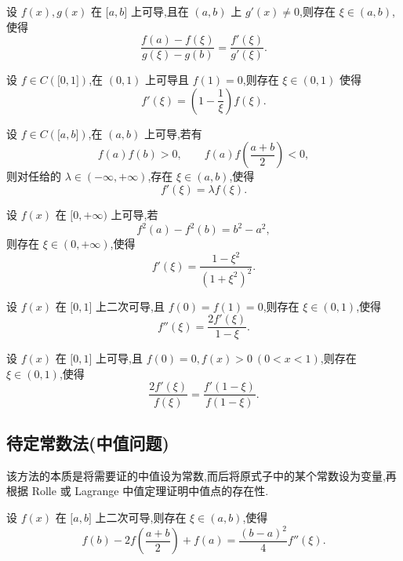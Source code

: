 \documentclass[../../数学分析培优讲义.tex]{subfiles}
\begin{document}
\begin{example}
设 $f(x),g(x)$ 在 $\lbrack a,b\rbrack$ 上可导,且在 $(a,b)$ 上 $g'(x)\neq0$,则存在 $\xi\in(a,b)$,使得
\[
    \dfrac{f(a)-f(\xi)}{g(\xi)-g(b)}=\dfrac{f'(\xi)}{g'(\xi)}.
\]
\end{example}
\exampleblank

\begin{example}
设 $f\in C(\lbrack 0,1\rbrack)$,在 $(0,1)$ 上可导且 $f(1)=0$,则存在 $\xi\in(0,1)$ 使得
\[
    f'(\xi)=\left(1-\dfrac{1}{\xi}\right)f(\xi).
\]
\end{example}
\exampleblank

\begin{example}
设 $f\in C(\lbrack a,b\rbrack)$,在 $(a,b)$ 上可导,若有
\[
    f(a)f(b)>0,
    \qquad
    f(a)f\left(\dfrac{a+b}{2}\right)<0,
\]
则对任给的 $\lambda\in(-\infty,+\infty)$,存在 $\xi\in(a,b)$,使得
\[
    f'(\xi)=\lambda f(\xi).
\]
\end{example}
\exampleblank

\begin{example}
设 $f(x)$ 在 $\lbrack 0,+\infty)$ 上可导,若
\[
    f^2(a)-f^2(b)=b^2-a^2,
\]
则存在 $\xi\in(0,+\infty)$,使得
\[
    f'(\xi)=\dfrac{1-\xi^2}{(1+\xi^2)^2}.
\]
\end{example}
\exampleblank

\begin{example}
设 $f(x)$ 在 $\lbrack 0,1\rbrack$ 上二次可导,且 $f(0)=f(1)=0$,则存在 $\xi\in(0,1)$,使得
\[
    f''(\xi)=\dfrac{2f'(\xi)}{1-\xi}.
\]
\end{example}
\exampleblank

\begin{example}
设 $f(x)$ 在 $\lbrack 0,1\rbrack$ 上可导,且 $f(0)=0,f(x)>0\ (0<x<1)$,则存在 $\xi\in(0,1)$,使得
\[
    \dfrac{2f'(\xi)}{f(\xi)}
    =\dfrac{f'(1-\xi)}{f(1-\xi)}.
\]
\end{example}
\exampleblank



\subsection{待定常数法(中值问题)}

该方法的本质是将需要证的中值设为常数,而后将原式子中的某个常数设为变量,再根据 Rolle 或 Lagrange 中值定理证明中值点的存在性.

\begin{example}
设 $f(x)$ 在 $\lbrack a,b\rbrack$ 上二次可导,则存在 $\xi\in(a,b)$,使得
\[
    f(b)-2f\left(\dfrac{a+b}{2}\right)+f(a)
    =\dfrac{(b-a)^2}{4}f''(\xi).
\]
\end{example}
\exampleblank
\end{document}
